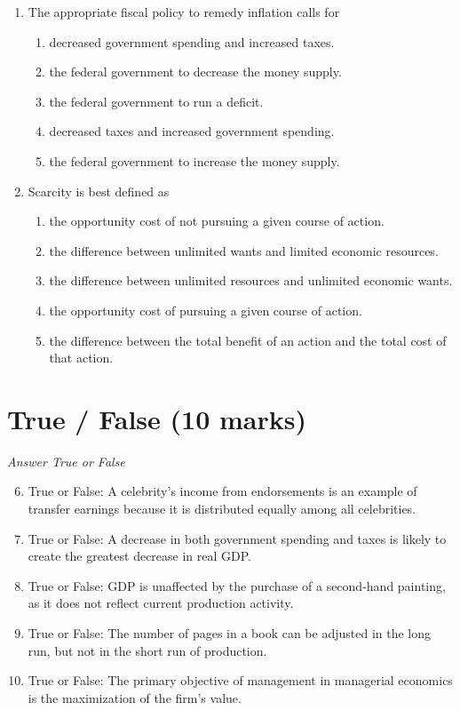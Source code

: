 \documentclass[12pt]{article}
\begin{document}
\begin{enumerate}[label=\arabic*.]
\begin{enumerate}[label=(\alph*)]
    \item High consumer loyalty to a single brand
    \item Lack of government regulation
    \item Constant production costs regardless of output levels
\end{enumerate}
\item The appropriate fiscal policy to remedy inflation calls for
\begin{enumerate}[label=(\alph*)]
    \item decreased government spending and increased taxes.
    \item the federal government to decrease the money supply.
    \item the federal government to run a deficit.
    \item decreased taxes and increased government spending.
    \item the federal government to increase the money supply.
\end{enumerate}
\item Scarcity is best defined as
\begin{enumerate}[label=(\alph*)]
    \item the opportunity cost of not pursuing a given course of action.
    \item the difference between unlimited wants and limited economic resources.
    \item the difference between unlimited resources and unlimited economic wants.
    \item the opportunity cost of pursuing a given course of action.
    \item the difference between the total benefit of an action and the total cost of that action.
\end{enumerate}
\end{enumerate}

\section*{True / False (10 marks)}
\textit{Answer True or False}
\begin{enumerate}[label=\arabic*.]
\setcounter{enumi}{5}
\item True or False: A celebrity's income from endorsements is an example of transfer earnings because it is distributed equally among all celebrities.
\item True or False: A decrease in both government spending and taxes is likely to create the greatest decrease in real GDP.
\item True or False: GDP is unaffected by the purchase of a second-hand painting, as it does not reflect current production activity.
\item True or False: The number of pages in a book can be adjusted in the long run, but not in the short run of production.
\item True or False: The primary objective of management in managerial economics is the maximization of the firm's value.
\end{enumerate}
\end{document}
